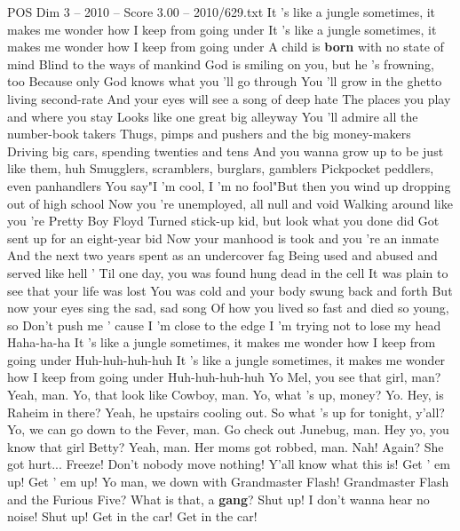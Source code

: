 \begin{textsample}{POS Dim 3 – 2010 – Score 3.00 – 2010/629.txt}
It 's like a jungle sometimes, it makes me wonder how I keep from going under It 's like a jungle sometimes, it makes me wonder how I keep from going under A child is \textbf{born} with no state of mind Blind to the ways of mankind God is smiling on you, but he 's frowning, too Because only God knows what you 'll go through You 'll grow in the ghetto living second-rate And your eyes will see a song of deep hate The places you play and where you stay Looks like one great big alleyway You 'll admire all the number-book takers Thugs, pimps and pushers and the big money-makers Driving big cars, spending twenties and tens And you wanna grow up to be just like them, huh Smugglers, scramblers, burglars, gamblers Pickpocket peddlers, even panhandlers You say"I 'm cool, I 'm no fool"But then you wind up dropping out of high school Now you 're unemployed, all null and void Walking around like you 're Pretty Boy Floyd Turned stick-up kid, but look what you done did Got sent up for an eight-year bid Now your manhood is took and you 're an inmate And the next two years spent as an undercover fag Being used and abused and served like hell ' Til one day, you was found hung dead in the cell It was plain to see that your life was lost You was cold and your body swung back and forth But now your eyes sing the sad, sad song Of how you lived so fast and died so young, so Don't push me ' cause I 'm close to the edge I 'm trying not to lose my head Haha-ha-ha It 's like a jungle sometimes, it makes me wonder how I keep from going under Huh-huh-huh-huh It 's like a jungle sometimes, it makes me wonder how I keep from going under Huh-huh-huh-huh Yo Mel, you see that girl, man?
Yeah, man.
Yo, that look like Cowboy, man.
Yo, what 's up, money?
Yo.
Hey, is Raheim in there?
Yeah, he upstairs cooling out.
So what 's up for tonight, y'all?
Yo, we can go down to the Fever, man.
Go check out Junebug, man.
Hey yo, you know that girl Betty?
Yeah, man.
Her moms got robbed, man.
Nah!
Again?
She got hurt...
Freeze!
Don't nobody move nothing!
Y'all know what this is!
Get ' em up!
Get ' em up!
Yo man, we down with Grandmaster Flash!
Grandmaster Flash and the Furious Five?
What is that, a \textbf{gang}?
Shut up!
I don't wanna hear no noise!
Shut up!
Get in the car!
Get in the car!

\end{textsample}
